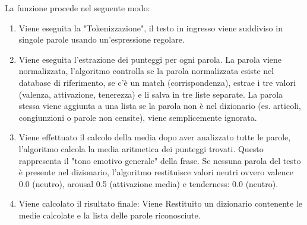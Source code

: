 La funzione procede nel seguente modo:
\begin{enumerate}
\item Viene eseguita la "Tokenizzazione", il testo in ingresso viene suddiviso in singole parole usando un'espressione regolare.
\item Viene eseguita l'estrazione dei punteggi per ogni parola.
La parola viene normalizzata, l'algoritmo controlla se la parola normalizzata esiste nel database di riferimento, se c'è un match (corrispondenza), estrae i tre valori (valenza, attivazione, tenerezza) e li salva in tre liste separate. 
La parola stessa viene aggiunta a una lista se la parola non è nel dizionario (es. articoli, congiunzioni o parole non censite), viene semplicemente ignorata.
\item Viene effettuato il calcolo della media dopo aver analizzato tutte le parole, l'algoritmo calcola la media aritmetica dei punteggi trovati. Questo rappresenta il "tono emotivo generale" della frase.
Se nessuna parola del testo è presente nel dizionario, l'algoritmo restituisce valori neutri ovvero valence 0.0 (neutro), arousal 0.5 (attivazione media) e tenderness: 0.0 (neutro).
\item Viene calcolato il risultato finale: Viene Restituito un dizionario contenente le medie calcolate e la lista delle parole riconosciute.
\end{enumerate}

